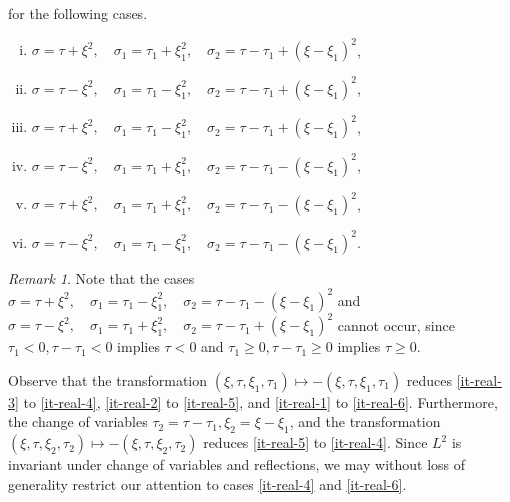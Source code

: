 \documentclass[12pt,reqno]{amsart}
\numberwithin{equation}{section}  %
\numberwithin{figure}{section}
\theoremstyle{plain}
\theoremstyle{definition}
\theoremstyle{remark}
\newtheorem{remark}{Remark}
\begin{document}
%
for the following cases.
\begin{enumerate}[(i)]
    \item $ \sigma=\tau+\xi^2,\quad \sigma_1=\tau_1+\xi_1^2,\quad \sigma_2=\tau -
      \tau_1+(\xi - \xi_1)^2$,
\label{it-real-1}
    \item $ \sigma=\tau-\xi^2,\quad \sigma_1=\tau_1-\xi_1^2,\quad \sigma_2=\tau - \tau_1+(\xi - \xi_1)^2$,
\label{it-real-2}
    \item  $\sigma=\tau+\xi^2,\quad \sigma_1=\tau_1-\xi_1^2,\quad \sigma_2=\tau - \tau_1+(\xi - \xi_1)^2$,
      \label{it-real-3}
    \item $\sigma=\tau-\xi^2,\quad \sigma_1=\tau_1+\xi_1^2,\quad \sigma_2=\tau - \tau_1-(\xi - \xi_1)^2$,
\label{it-real-4}
    \item $\sigma=\tau+\xi^2,\quad \sigma_1=\tau_1+\xi_1^2,\quad \sigma_2=\tau - \tau_1-(\xi - \xi_1)^2$,
\label{it-real-5}
    \item $\sigma=\tau-\xi^2,\quad \sigma_1=\tau_1-\xi_1^2,\quad \sigma_2=\tau - \tau_1-(\xi - \xi_1)^2$.
\label{it-real-6}
\end{enumerate}
%
%
\begin{framed}
\begin{remark}
Note that the cases $\sigma=\tau+\xi^2,\quad \sigma_1=\tau_1-\xi_1^2,\quad
\sigma_2=\tau - \tau_1-(\xi - \xi_1)^2$ and $\sigma=\tau-\xi^2,\quad
\sigma_1=\tau_1+\xi_1^2,\quad \sigma_2=\tau - \tau_1+(\xi - \xi_1)^2$ cannot occur, since
$\tau_1< 0, \tau-\tau_1< 0$ implies $\tau<0$ and $\tau_1\geq 0, \tau-\tau_1\geq
0$ implies $\tau\geq 0$.
\end{remark}
\end{framed}
%
Observe that the transformation $(\xi, \tau, \xi_{1}, \tau_{1}) \mapsto -(\xi, \tau,
\xi_{1}, \tau_{1})$ reduces \eqref{it-real-3} to \eqref{it-real-4}, \eqref{it-real-2} to
\eqref{it-real-5}, and \eqref{it-real-1} to \eqref{it-real-6}. Furthermore, the change of
variables $\tau_{2} = \tau - \tau_{1}, \xi_{2} = \xi - \xi_{1}$, and the
transformation $(\xi, \tau, \xi_{2}, \tau_{2}) \mapsto - (\xi, \tau, \xi_{2},
\tau_{2})$ reduces \eqref{it-real-5} to \eqref{it-real-4}. Since $L^{2}$ is invariant
under change of variables and reflections, we may without loss of generality
restrict our attention to cases \eqref{it-real-4} and \eqref{it-real-6}.
\end{document}
